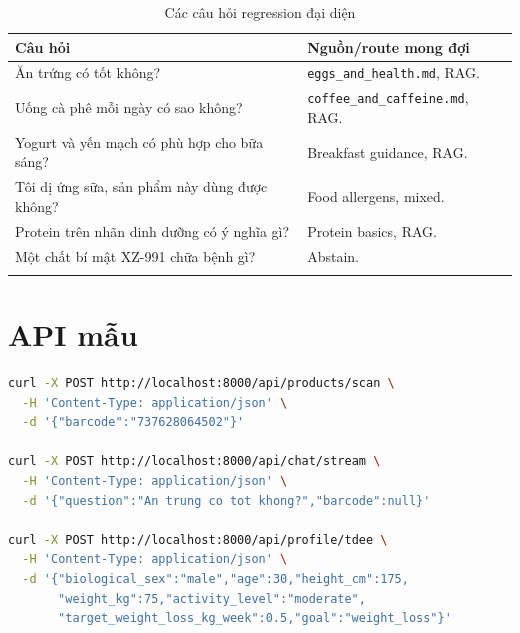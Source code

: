 \documentclass[12pt,a4paper]{report}
\newcommand{\code}[1]{\texttt{#1}}
\begin{document}
\begin{longtable}{p{}p{}}
\toprule
\textbf{Câu hỏi} & \textbf{Nguồn/route mong đợi}\\
\midrule
\endhead
Ăn trứng có tốt không? & \code{eggs\_and\_health.md}, RAG.\\
Uống cà phê mỗi ngày có sao không? & \code{coffee\_and\_caffeine.md}, RAG.\\
Yogurt và yến mạch có phù hợp cho bữa sáng? & Breakfast guidance, RAG.\\
Tôi dị ứng sữa, sản phẩm này dùng được không? & Food allergens, mixed.\\
Protein trên nhãn dinh dưỡng có ý nghĩa gì? & Protein basics, RAG.\\
Một chất bí mật XZ-991 chữa bệnh gì? & Abstain.\\
\bottomrule
\caption{Các câu hỏi regression đại diện}
\end{longtable}

\chapter{API mẫu}

\begin{lstlisting}[language=bash]
curl -X POST http://localhost:8000/api/products/scan \
  -H 'Content-Type: application/json' \
  -d '{"barcode":"737628064502"}'

curl -X POST http://localhost:8000/api/chat/stream \
  -H 'Content-Type: application/json' \
  -d '{"question":"An trung co tot khong?","barcode":null}'

curl -X POST http://localhost:8000/api/profile/tdee \
  -H 'Content-Type: application/json' \
  -d '{"biological_sex":"male","age":30,"height_cm":175,
       "weight_kg":75,"activity_level":"moderate",
       "target_weight_loss_kg_week":0.5,"goal":"weight_loss"}'
\end{lstlisting}
\end{document}
